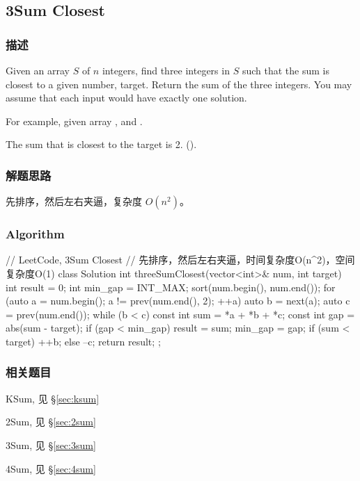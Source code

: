 \subsection{3Sum Closest} %
\label{sec:3sum-closest}


\subsubsection{描述}
Given an array $S$ of $n$ integers, find three integers in $S$ such that the 
sum is closest to a given number, target. Return the sum of the three integers. 
You may assume that each input would have exactly one solution.

For example, given array , and .

The sum that is closest to the target is 2. ().


\subsubsection{解题思路}
先排序，然后左右夹逼，复杂度 $O(n^2)$。


\subsubsection{Algorithm}
\begin{Code}
	// LeetCode, 3Sum Closest
	// 先排序，然后左右夹逼，时间复杂度O(n^2)，空间复杂度O(1)
	class Solution {
		int threeSumClosest(vector<int>& num, int target) {
			int result = 0;
			int min_gap = INT_MAX;
			sort(num.begin(), num.end());
			for (auto a = num.begin(); a != prev(num.end(), 2); ++a) {
				auto b = next(a);
				auto c = prev(num.end());
				while (b < c) {
					const int sum = *a + *b + *c;
					const int gap = abs(sum - target);
					if (gap < min_gap) {
						result = sum;
						min_gap = gap;
					}
					if (sum < target) ++b;
					else              --c;
				}
			}
			return result;
		}
	};
\end{Code}


\subsubsection{相关题目}
\begindot
\item KSum, 见 \S \ref{sec:ksum}
\item 2Sum, 见 \S \ref{sec:2sum}
\item 3Sum, 见 \S \ref{sec:3sum}
\item 4Sum, 见 \S \ref{sec:4sum}
\myenddot


